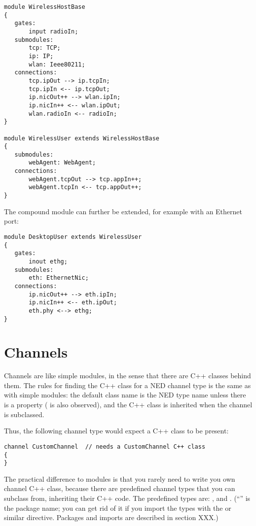 \begin{Verbatim}
module WirelessHostBase
{
   gates:
       input radioIn;
   submodules:
       tcp: TCP;
       ip: IP;
       wlan: Ieee80211;
   connections:
       tcp.ipOut --> ip.tcpIn;
       tcp.ipIn <-- ip.tcpOut;
       ip.nicOut++ --> wlan.ipIn;
       ip.nicIn++ <-- wlan.ipOut;
       wlan.radioIn <-- radioIn;
}

module WirelessUser extends WirelessHostBase
{
   submodules:
       webAgent: WebAgent;
   connections:
       webAgent.tcpOut --> tcp.appIn++;
       webAgent.tcpIn <-- tcp.appOut++;
}
\end{Verbatim}

The  compound module can further be extended,
for example with an Ethernet port:

\begin{Verbatim}
module DesktopUser extends WirelessUser
{
   gates:
       inout ethg;
   submodules:
       eth: EthernetNic;
   connections:
       ip.nicOut++ --> eth.ipIn;
       ip.nicIn++ <-- eth.ipOut;
       eth.phy <--> ethg;
}
\end{Verbatim}



\section{Channels}
\label{sec:ch-ned-lang:channels}

Channels are like simple modules, in the sense that there are C++ classes
behind them. The rules for finding the C++ class for a NED channel type is
the same as with simple modules: the default class name is the NED type
name unless there is a  property ( is also
observed), and the C++ class is inherited when the channel is subclassed.

Thus, the following channel type would expect a  C++ class
to be present:

\begin{Verbatim}
channel CustomChannel  // needs a CustomChannel C++ class
{
}
\end{Verbatim}

The practical difference to modules is that you rarely need to write you own
channel C++ class, because there are predefined channel types that you can
subclass from, inheriting their C++ code. The predefined types are:
,  and .
(``'' is the package name; you can get rid of it if you import the types
with the  or similar directive. Packages and imports
are described in section XXX.)

